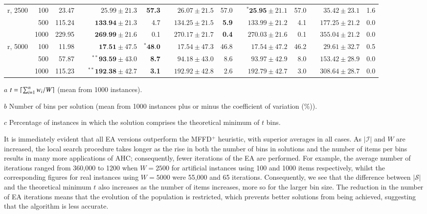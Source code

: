 \documentclass[a4paper,11pt,authoryear]{elsarticle}
\begin{document}
\begin{table}[h]
\begin{threeparttable}
{\begin{tabular}{crrcrrcrrcrrcrr}
	\midrule
	\midrule
	r, 2500 & 100 & 23.47 && $25.99 \pm 21.3$ & \textbf{57.3} && $26.07 \pm 21.5$ & 57.0 && $^{*}\textbf{25.95} \pm 21.1$ & 57.0 && $35.42 \pm 23.1$ & 1.6 \\
	& 500 & 115.24 && $\textbf{133.94} \pm 21.3$ & 4.7 && $134.25 \pm 21.5$ & \textbf{5.9} && $133.99 \pm 21.2$ & 4.1 && $177.25 \pm 21.2$ & 0.0 \\
	& 1000 & 229.95 && $\textbf{269.99} \pm 21.6$ & 0.1 && $270.17 \pm 21.7$ & \textbf{0.4} && $270.03 \pm 21.6$ & 0.1 && $355.04 \pm 21.2$ & 0.0 \\
	\midrule
	r, 5000 & 100 & 11.98 && $\textbf{17.51} \pm 47.5$ & $^{*}\textbf{48.0}$ && $17.54 \pm 47.3$ & 46.8 && $17.54 \pm 47.2$ & 46.2 && $29.61 \pm 32.7$ & 0.5 \\
	& 500 & 57.87 && $^{**}\textbf{93.59} \pm 43.0$ & \textbf{8.7} && $94.18 \pm 43.0$ & 8.6 && $93.97 \pm 42.9$ & 8.0 && $153.42 \pm 28.9$ & 0.0 \\
	& 1000 & 115.23 && $^{**}\textbf{192.38} \pm 42.7$ & \textbf{3.1} && $192.92 \pm 42.8$ & 2.6 && $192.79 \pm 42.7$ & 3.0 && $308.64 \pm 28.7$ & 0.0 \\
	\bottomrule
\end{tabular}}	
\vspace{0.2cm} %
\begin{tablenotes}
	\tiny
	\item[$a$] $t = \lceil\sum_{i=1}^{n} w_i / W\rceil$ (mean from 1000 instances).
	\item[$b$] Number of bins per solution (mean from 1000 instances plus or minus the coefficient of variation (\%)).
	\item[$c$] Percentage of instances in which the solution comprises the theoretical minimum of $t$ bins.
\end{tablenotes}
\end{threeparttable}
\label{table:ea}
\end{table}

It is immediately evident that all EA versions outperform the MFFD$^+$ heuristic, with superior averages in all cases. As $|\mathcal{I}|$ and $W$ are increased, the local search procedure takes longer as the rise in both the number of bins in solutions and the number of items per bins results in many more applications of AHC; consequently, fewer iterations of the EA are performed. For example, the average number of iterations ranged from 360,000 to 1200 when $W=2500$ for artificial instances using 100 and 1000 items respectively, whilst the corresponding figures for real instances using $W=5000$ were 55,000 and 65 iterations. Consequently, we see that the difference between $|\mathcal{S}|$ and the theoretical minimum $t$ also increases as the number of items increases, more so for the larger bin size. The reduction in the number of EA iterations means that the evolution of the population is restricted, which prevents better solutions from being achieved, suggesting that the algorithm is less accurate.
\end{document}

